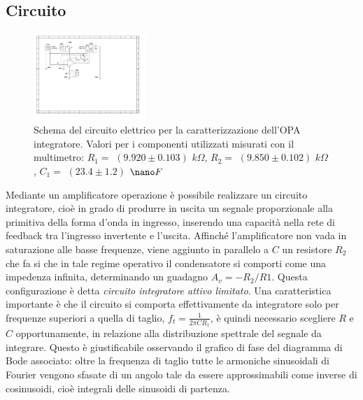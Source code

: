 \documentclass[journal]{IEEEtran}
\begin{document}
\subsection{\textbf{Circuito}}
\begin{figure}[H]%
\begin {center}
\includegraphics[width=0.38\textwidth]{sch-simulations/output/OPA-integratore.pdf}
\caption{Schema  del  circuito  elettrico  per  la  caratterizzazione  dell’OPA integratore.  Valori  per  i  componenti  utilizzati  misurati  con il multimetro: $R_1 =$ $(9.920 \pm 0.103)$ $k\Omega$, $R_2 =$ $(9.850 \pm 0.102)$ $k\Omega$, $C_1 =$ $(23.4 \pm 1.2)$ $\nano F$}
\label{fig:OPA-integ}
\end {center}
\end{figure}
Mediante un amplificatore operazione è possibile realizzare un circuito integratore, cioè in grado di produrre in uscita un segnale proporzionale alla primitiva della forma d'onda in ingresso, inserendo una capacità nella rete di feedback tra l'ingresso invertente e l'uscita.
Affinché l'amplificatore non vada in saturazione alle basse frequenze, viene aggiunto in parallelo a $C$ un resistore $R_{2}$ che fa si che in tale regime operativo il condensatore si comporti come una impedenza infinita, determinando un guadagno $A_{v}=-R_{2}/R{1}$. Questa configurazione è detta \textit{circuito integratore attivo limitato}. 
Una caratteristica importante è che il circuito si comporta effettivamente da integratore solo per frequenze superiori a quella di taglio, $f_{t}=\frac{1}{2 \pi C R_{1} }$, è quindi necessario scegliere $R$ e $C$ opportunamente, in relazione alla distribuzione spettrale del segnale da integrare. Questo è giustificabile osservando il grafico di fase del diagramma di Bode associato: oltre la frequenza di taglio tutte le armoniche sinusoidali di Fourier vengono sfasate di un angolo tale da essere approssimabili come inverse di cosinusoidi, cioè integrali delle sinusoidi di partenza.
\end{document}
